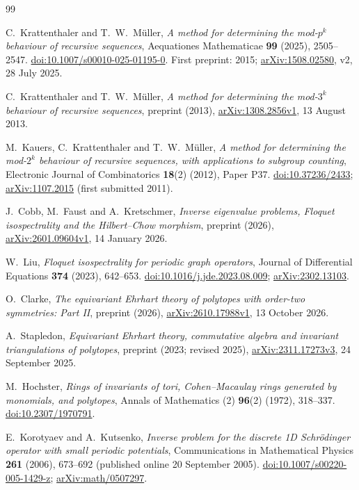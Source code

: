 \documentclass[11pt,a4paper]{article}
\theoremstyle{definition}
\theoremstyle{remark}\newtheorem{remark}[lemma]{Remark}
\begin{document}
\begin{thebibliography}{99}

C.~Krattenthaler and T.~W.~M\"uller,
\emph{A method for determining the mod-$p^k$ behaviour of recursive sequences},
Aequationes Mathematicae \textbf{99} (2025), 2505--2547.
\href{https://doi.org/10.1007/s00010-025-01195-0}{doi:10.1007/s00010-025-01195-0}.
First preprint: 2015; \href{https://arxiv.org/abs/1508.02580}{arXiv:1508.02580}, v2, 28 July 2025.

C.~Krattenthaler and T.~W.~M\"uller,
\emph{A method for determining the mod-$3^k$ behaviour of recursive sequences},
preprint (2013), \href{https://arxiv.org/abs/1308.2856}{arXiv:1308.2856v1}, 13 August 2013.

M.~Kauers, C.~Krattenthaler and T.~W.~M\"uller,
\emph{A method for determining the mod-$2^k$ behaviour of recursive sequences, with applications to subgroup counting},
Electronic Journal of Combinatorics \textbf{18}(2) (2012), Paper P37.
\href{https://doi.org/10.37236/2433}{doi:10.37236/2433};
\href{https://arxiv.org/abs/1107.2015}{arXiv:1107.2015} (first submitted 2011).

J.~Cobb, M.~Faust and A.~Kretschmer,
\emph{Inverse eigenvalue problems, Floquet isospectrality and the Hilbert--Chow morphism},
preprint (2026), \href{https://arxiv.org/abs/2601.09604}{arXiv:2601.09604v1}, 14 January 2026.

W.~Liu,
\emph{Floquet isospectrality for periodic graph operators},
Journal of Differential Equations \textbf{374} (2023), 642--653.
\href{https://doi.org/10.1016/j.jde.2023.08.009}{doi:10.1016/j.jde.2023.08.009};
\href{https://arxiv.org/abs/2302.13103}{arXiv:2302.13103}.

O.~Clarke,
\emph{The equivariant Ehrhart theory of polytopes with order-two symmetries: Part II},
preprint (2026), \href{https://arxiv.org/abs/2610.17988}{arXiv:2610.17988v1}, 13 October 2026.

A.~Stapledon,
\emph{Equivariant Ehrhart theory, commutative algebra and invariant triangulations of polytopes},
preprint (2023; revised 2025),
\href{https://arxiv.org/abs/2311.17273}{arXiv:2311.17273v3}, 24 September 2025.

M.~Hochster,
\emph{Rings of invariants of tori, Cohen--Macaulay rings generated by monomials, and polytopes},
Annals of Mathematics (2) \textbf{96}(2) (1972), 318--337.
\href{https://doi.org/10.2307/1970791}{doi:10.2307/1970791}.

E.~Korotyaev and A.~Kutsenko,
\emph{Inverse problem for the discrete 1D Schr\"odinger operator with small periodic potentials},
Communications in Mathematical Physics \textbf{261} (2006), 673--692
(published online 20 September 2005).
\href{https://doi.org/10.1007/s00220-005-1429-z}{doi:10.1007/s00220-005-1429-z};
\href{https://arxiv.org/abs/math/0507297}{arXiv:math/0507297}.

\end{thebibliography}
\end{document}
